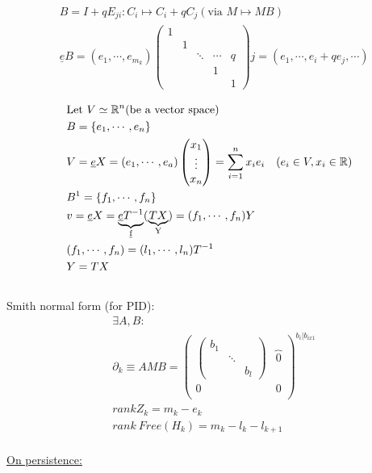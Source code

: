 \documentclass[11pt,a4paper]{report}
\begin{document}
              \begin{align*}
                &B = I + qE_{ji}: C_i \mapsto C_i + qC_j (\textrm{via } M \mapsto MB)\\
                &\underline{e}B = (e_1, \cdots, e_{m_{k}})\begin{pmatrix}1 &&&& \\ & 1 &&& \\ && \ddots & \cdots & q\\ &&& 1 &\\ &&&& 1\end{pmatrix}j = (e_1, \cdots, e_i + qe_j, \cdots)\\
              \end{align*}
              \begin{align*}
                &\textrm{Let } V \simeq \mathbb{\mathbb{R}}^n (\textrm{be a vector space})\\
                &B = \{e_1, \cdots, e_n\}\\
                &V = \underline{e}X = (e_1, \cdots, e_a)\begin{pmatrix}x_1\\\vdots\\x_n\end{pmatrix}= \sum_{i=1}^nx_ie_i \quad (e_i \in V, x_i \in \mathbb{R})\\
                &B^1 = \{f_1, \cdots, f_n\}\\
                &v = \underline{e}X = \underbrace{\underline{e} T^{-1}}_\text{\underline{f}}(\underbrace{TX}_\text{Y})= (f_1, \cdots, f_n) Y\\
                &(f_1, \cdots, f_n) = (l_1, \cdots, l_n) T^{-1}\\
                &Y = TX \\
                \end{align*}
              \\
              Smith normal form (for PID):
              \begin{align*}
                &\exists A, B:\\
                &\partial_k \equiv AMB = \left(\begin{array}{c|c}
                               \begin{pmatrix}b_1 && \\ & \ddots & \\ && b_l\end{pmatrix}& \overbrace{0}^\text{}\\
                               \hline
                               0 & 0 \\
                             \end{array}\right)^{b_{i} | b_{ix1}}
                \\
                &rank Z_k = m_k - e_k\\
                &rank\ Free(H_k) = m_k - l_k - l_{k+1}
              \end{align*}
              \\
              \underline{On persistence:}
              
\end{document}
